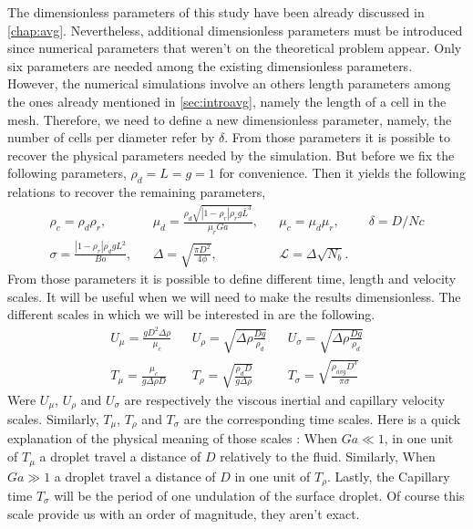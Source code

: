 The dimensionless parameters of this study have been already discussed in \ref{chap:avg}.
Nevertheless, additional dimensionless parameters must be introduced since numerical parameters that weren't on the theoretical problem appear. 
Only six parameters are needed among the existing dimensionless parameters. 
However, the numerical simulations involve an others length parameters among the ones already mentioned in \ref{sec:introavg}, namely the length of a cell in the mesh.
Therefore, we need to define a new dimensionless parameter, namely, the number of cells per diameter refer by $\delta$. 
From those parameters it is possible to recover the physical parameters needed by the simulation. 
But before we fix the following parameters, $\rho_d = L = g = 1$ for convenience.
Then it yields the following relations to recover the remaining parameters,
\begin{align*}
    &\rho_c = \rho_d\rho_r ,&
    &\mu_d  =\frac{\rho_d \sqrt{|1-\rho_r| \rho_r g \bar{L}^3}}{\mu_r Ga},&
    &\mu_c  = \mu_d\mu_r,&
    &\delta  = D/Nc& \\
    &\sigma = \frac{|1-\rho_r|\rho_d g L^2}{Bo},&
    &\Delta = \sqrt{\frac{\pi D^2}{4\phi}},&
    &\mathcal{L} = \Delta \sqrt{N_b}.&
\end{align*}
From those parameters it is possible to define different time, length and velocity scales. 
It will be useful when we will need to make the results dimensionless. 
The different scales in which we will be interested in are the following.
\begin{align*}
    &U_\mu = \frac{g D^2 \Delta \rho}{\mu_c}&
    &U_\rho = \sqrt{\Delta \rho \frac{Dg}{\rho_d}}&
    &U_\sigma = \sqrt{\Delta \rho \frac{Dg}{\rho_d}}& \\
    &T_\mu = \frac{\mu_c}{g\Delta \rho D}&
    &T_\rho = \sqrt{\frac{\rho_dD}{g\Delta\rho}}&
    &T_\sigma = \sqrt{\frac{\rho_{avg} D^3}{\pi \sigma}}&
\end{align*}
Were $U_\mu$, $U_\rho$ and $U_\sigma$ are respectively the viscous inertial and capillary velocity scales. 
Similarly, $T_\mu$, $T_\rho$ and $T_\sigma$ are the corresponding time scales. 
Here is a quick explanation of the physical meaning of those scales :
When $Ga \ll 1$, in one unit of $T_\mu$ a droplet travel a distance of $D$ relatively to the fluid.  
Similarly, When $Ga \gg 1$ a droplet travel a distance of $D$ in one unit of $T_\rho$. 
Lastly, the Capillary time $T_\sigma$ will be the period of one undulation of the surface droplet. 
Of course this scale provide us with an order of magnitude, they aren't exact. 

